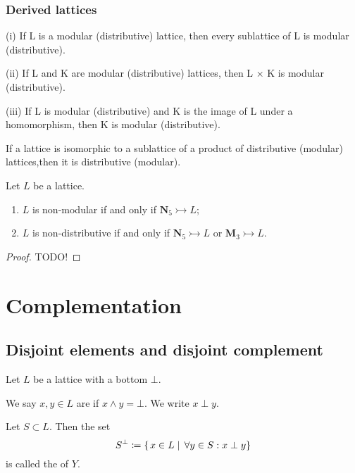 \subsubsection{Derived lattices}

\begin{proposition}
(i) If L is a modular (distributive) lattice, then every sublattice of L
is modular (distributive).

(ii) If L and K are modular (distributive) lattices, then L × K is
modular (distributive).

(iii) If L is modular (distributive) and K is the image of L under a
homomorphism, then K is modular (distributive).
\end{proposition}
\begin{corollary}
If a lattice is isomorphic to a sublattice of a product
of distributive (modular) lattices,then it is distributive (modular).
\end{corollary}

\begin{theorem}
Let $L$ be a lattice.
\begin{enumerate}
\item $L$ is non-modular \textup{if and only if} $\mathbf{N}_5 \rightarrowtail L$;
\item $L$ is non-distributive \textup{if and only if} $\mathbf{N}_5 \rightarrowtail L$ or $\mathbf{M}_3 \rightarrowtail L$.
\end{enumerate}
\end{theorem}
\begin{proof}
TODO!
\end{proof}


\section{Complementation}
\subsection{Disjoint elements and disjoint complement}
\begin{definition}
Let $L$ be a lattice with a bottom $\bot$.

We say $x,y\in L$ are  if $x\wedge y = \bot$. We write $x \perp y$.

Let $S\subset L$. Then the set
\[ S^\perp \coloneqq \left\{\left. x\in L \;\right|\; \forall y\in S: x\perp y \right\} \]
is called the  of $Y$.
\end{definition}

